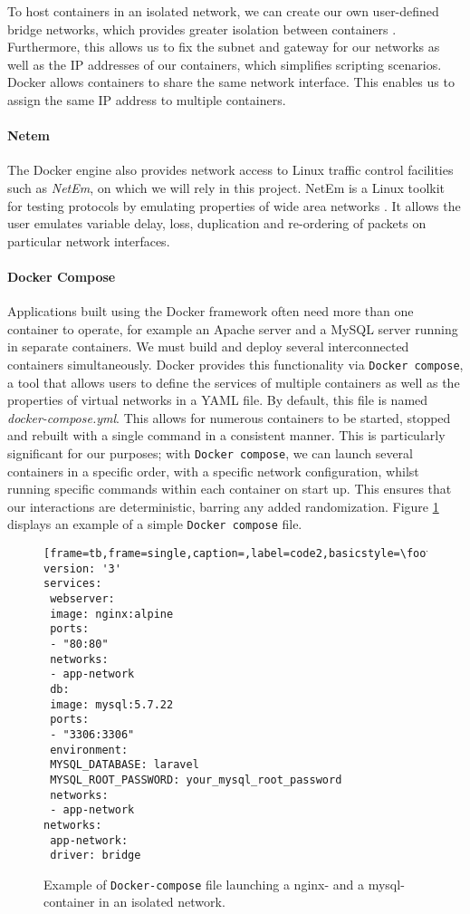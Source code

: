 To host containers in an isolated network, we can create our own user-defined bridge networks, which provides greater isolation between containers \cite{docker_docs}. Furthermore, this allows us to fix the subnet and gateway for our networks as well as the IP addresses of our containers, which simplifies scripting scenarios. Docker allows containers to share the same network interface. This enables us to assign the same IP address to multiple containers.%

\paragraph*{Netem} 
The Docker engine also provides network access to Linux traffic control facilities such as \emph{NetEm}, on which we will rely in this project. NetEm is a Linux toolkit for testing protocols by emulating properties of wide area networks \cite{hemminger2005network}. It allows the user emulates variable delay, loss, duplication and re-ordering of packets on particular network interfaces.




\paragraph*{Docker Compose}
Applications built using the Docker framework often need more than one container to operate, for example an Apache server and a MySQL server running in separate containers. We must build and deploy several interconnected containers simultaneously. Docker provides this functionality via \texttt{Docker compose}, a tool that allows users to define the services of multiple containers as well as the properties of virtual networks in a YAML file. By default, this file is named \textit{docker-compose.yml}. This allows for numerous containers to be started, stopped and rebuilt with a single command in a consistent manner. This is particularly significant for our purposes; with \texttt{Docker compose}, we can launch several containers in a specific order, with a specific network configuration, whilst running specific commands within each container on start up. This ensures that our interactions are deterministic, barring any added randomization. Figure \ref{figD:dockercompose} displays an example of a simple \texttt{Docker compose} file.

\begin{figure}
\begin{lstlisting}[frame=tb,frame=single,caption=,label=code2,basicstyle=\footnotesize]
version: '3'
services:
 webserver:
 image: nginx:alpine
 ports:
 - "80:80"
 networks:
 - app-network
 db:
 image: mysql:5.7.22
 ports:
 - "3306:3306"
 environment:
 MYSQL_DATABASE: laravel
 MYSQL_ROOT_PASSWORD: your_mysql_root_password
 networks:
 - app-network
networks:
 app-network:
 driver: bridge
\end{lstlisting}
\caption{Example of \texttt{Docker-compose} file launching a nginx- and a mysql-container in an isolated network.}
\label{figD:dockercompose}
\end{figure}{}


